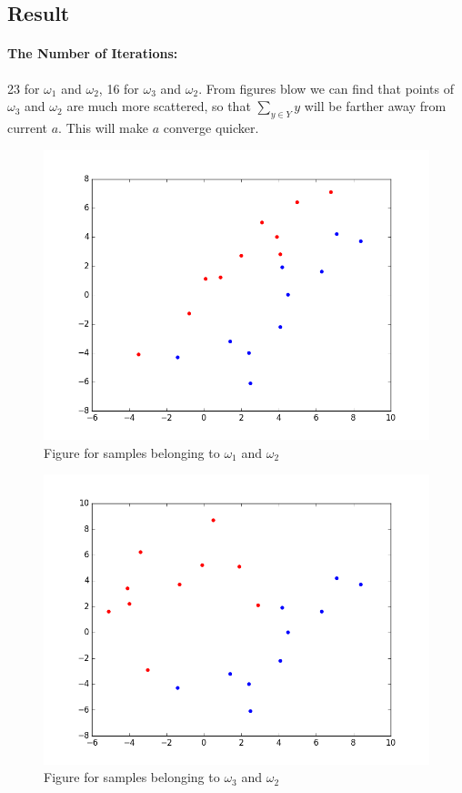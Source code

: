 \documentclass[]{article}
\begin{document}
    \subsection{Result}
    \paragraph{The Number of Iterations:} 23 for $\omega_1$ and $\omega_2$, 16 for $\omega_3$ and $\omega_2$. From figures blow we can find that points of $\omega_3$ and $\omega_2$ are much more scattered, so that $\sum_{y \in Y} y$  will be farther away from current $a$. This will make $a$ converge quicker. 
    \begin{figure}[H]
        \centering
        \includegraphics[scale=0.4]{1_1_2.png}
        \caption{Figure for samples belonging to $\omega_1$ and $\omega_2$}
    \end{figure}
    \begin{figure}[H]
        \centering
        \includegraphics[scale=0.4]{1_3_2.png}
        \caption{Figure for samples belonging to $\omega_3$ and $\omega_2$}
    \end{figure}
\end{document}

